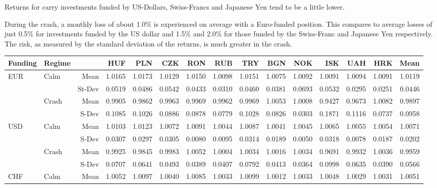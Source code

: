 \documentclass[12pt, a4paper, oneside]{article} %
\begin{document}
Returns for carry investments funded by US-Dollars, Swiss-Francs and Japanese Yen tend to be a little lower. 

During the crash, a monthly loss of about 1.0\% is experienced on average with a Euro-funded position.  This compares to average losses of just 0.5\% for investments funded by the US dollar and 1.5\% and 2.0\% for those funded by the Swiss-Franc and Japanese Yen respectively. The risk, as measured by the standard deviation of the  returns, is much greater in the crash.   


\begin{landscape}
\begin{table}[ht]
\centering
\begin{tabular}{llrrrrrrrrrrrrr}
  \hline
 Funding & Regime& & HUF & PLN & CZK & RON & RUB & TRY & BGN & NOK & ISK & UAH & HRK & Mean \\ 
  \hline
  \hline
\multirow{4}{*}{EUR}& \multirow{2}{*}{Calm}& Mean & 1.0165 & 1.0173 & 1.0129 & 1.0150 & 1.0098 & 1.0151 & 1.0075 & 1.0092 & 1.0091 & 1.0094 & 1.0091 & 1.0119 \\ 
&&St-Dev& 0.0519 & 0.0486 & 0.0542 & 0.0433 & 0.0310 & 0.0460 & 0.0381 & 0.0693 & 0.0532 & 0.0295 & 0.0251 & 0.0446 \\ 
&\multirow{2}{*}{Crash}& Mean & 0.9905 & 0.9862 & 0.9963 & 0.9969 & 0.9962 & 0.9969 & 1.0053 & 1.0008 & 0.9427 & 0.9673 & 1.0082 & 0.9897 \\ 
 &&S-Dev & 0.1085 & 0.1026 & 0.0886 & 0.0878 & 0.0779 & 0.1028 & 0.0826 & 0.0303 & 0.1871 & 0.1116 & 0.0737 & 0.0958 \\ 
\hline
\multirow{4}{*}{USD}&\multirow{2}{*}{Calm}&Mean& 1.0103 & 1.0123 & 1.0072 & 1.0091 & 1.0044 & 1.0087 & 1.0041 & 1.0045 & 1.0065 & 1.0055 & 1.0054 & 1.0071 \\ 
&&S-Dev& 0.0307 & 0.0297 & 0.0305 & 0.0080 & 0.0095 & 0.0314 & 0.0189 & 0.0050 & 0.0318 & 0.0078 & 0.0187 & 0.0202 \\ 
  &\multirow{2}{*}{Crash}&Mean& 0.9925 & 0.9845 & 0.9983 & 1.0052 & 1.0004 & 1.0034 & 1.0016 & 1.0034 & 0.9691 & 0.9932 & 1.0036 & 0.9959 \\ 
   & & S-Dev & 0.0707 & 0.0641 & 0.0493 & 0.0389 & 0.0407 & 0.0792 & 0.0413 & 0.0364 & 0.0998 & 0.0635 & 0.0390 & 0.0566 \\ 
\hline
\multirow{4}{*}{CHF}& \multirow{2}{*}{Calm}&Mean& 1.0052 & 1.0097 & 1.0040 & 1.0085 & 1.0033 & 1.0099 & 1.0012 & 1.0033 & 1.0048 & 1.0029 & 1.0031 & 1.0051 \\ 

\end{tabular}
\end{table}
\end{landscape}
\end{document}
